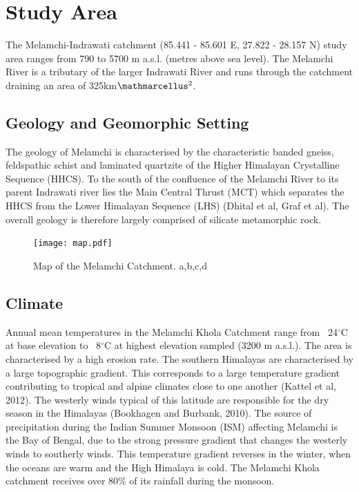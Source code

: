 
\section{Study Area}



The Melamchi-Indrawati catchment (85.441 - 85.601 E, 27.822 - 28.157 N) study area ranges from 790 to 5700 m a.s.l. (metres above sea level). The Melamchi River is a tributary of the larger Indrawati River and runs through the catchment draining an area of 325km$\ttmath{^2}$. 

\subsection{Geology and Geomorphic Setting}


The geology of Melamchi is characterised by the characteristic banded gneiss, feldspathic schist and laminated quartzite of the Higher Himalayan Crystalline Sequence (HHCS). To the south of the confluence of the Melamchi River to its parent Indrawati river lies the Main Central Thrust (MCT) which separates the HHCS from the Lower Himalayan Sequence (LHS) (Dhital et al, Graf et al). The overall geology is therefore largely comprised of silicate metamorphic rock.

\begin{figure}[h]
    \centering
    \texttt{[image: map.pdf]}
    \caption{Map of the Melamchi Catchment. a,b,c,d}
    \label{fig:map}
\end{figure}

\subsection{Climate}

Annual mean temperatures in the Melamchi Khola Catchment range from ~24$^{\circ}$C at base elevation to ~8$^{\circ}$C at highest elevation sampled (3200 m a.s.l.). The area is characterised by a high erosion rate.  The southern Himalayas are characterised by a large topographic gradient. This corresponds to a large temperature gradient contributing to tropical and alpine climates close to one another (Kattel et al, 2012). The westerly winds typical of this latitude are responsible for the dry season in the Himalayas (Bookhagen and Burbank, 2010). The source of precipitation during the Indian Summer Monsoon (ISM) affecting Melamchi is the Bay of Bengal, due to the strong pressure gradient that changes the westerly winds to southerly winds. This temperature gradient reverses in the winter, when the oceans are warm and the High Himalaya is cold.  The Melamchi Khola catchment receives over 80\% of its rainfall during the monsoon.

